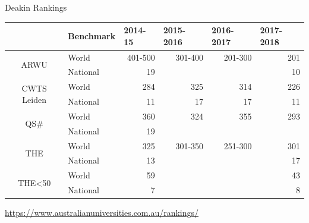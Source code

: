 \documentclass[
 size=14pt,
 paper=smartboard,  %
 mode=present, 		%
 display=slides, 	%
 pauseslide,
 fleqn,leqno]{powerdot}{}
\begin{document}
\begin{slide}{Deakin Rankings}
\begin{table}[htbp]
  \setlength{\abovecaptionskip}{-2pt}
  \setlength{\belowcaptionskip}{12pt}
  \centering
    \begin{tabular}{clrrrr}
    \toprule
      & Benchmark & \multicolumn{1}{l}{2014-15} & \multicolumn{1}{l}{2015-2016} & \multicolumn{1}{l}{2016-2017} & \multicolumn{1}{l}{2017-2018} \\ \midrule
    \multirow{2}[0]{*}{ARWU} & World & 401-500 & 301-400 & 201-300 & 201 \\
      & National  & 19 &   &   & 10 \\
      \midrule
    \multirow{2}[0]{*}{CWTS Leiden} & World  & 284 & 325 & 314 & 226 \\
      & National  & 11 & 17 & 17 & 11 \\
      \midrule
    \multirow{2}[0]{*}{QS\#} & World  & 360 & 324 & 355 & 293 \\
      & National & 19 &   &   &  \\
      \midrule
    \multirow{2}[0]{*}{THE} & World  & 325 & 301-350 & 251-300 & 301 \\
      & National  & 13 &   &   & 17 \\
      \midrule
    \multirow{2}[0]{*}{THE<50} & World  & 59 &   &   & 43 \\
      & National  & 7 &   &   & 8 \\
      \bottomrule
    \end{tabular}
  \label{tab:Deakin Ranking}
\end{table}
\centering
\url{https://www.australianuniversities.com.au/rankings/}
\end{slide}
\end{document}
